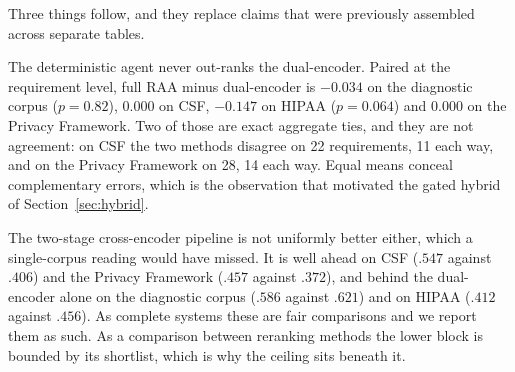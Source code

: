 \documentclass[a4paper,fleqn]{cas-sc}
\begin{document}
\begin{table}[htbp]
\caption{Top-1 accuracy for every method on all four corpora under the primary protocol: one scoring pass per requirement over the full control corpus, LSI fitted on controls only. The lower block reranks the dual-encoder's top 20 rather than the corpus, so it is bounded by that shortlist; its ceiling is given beneath it.}
\label{tab:unified}
\centering
\setlength{\tabcolsep}{3pt}
\small
{}
\end{table}

Three things follow, and they replace claims that were previously assembled across separate tables.

The deterministic agent never out-ranks the dual-encoder. Paired at the requirement level, full RAA minus dual-encoder is $-0.034$ on the diagnostic corpus ($p = 0.82$), $0.000$ on CSF, $-0.147$ on HIPAA ($p = 0.064$) and $0.000$ on the Privacy Framework. Two of those are exact aggregate ties, and they are not agreement: on CSF the two methods disagree on 22 requirements, 11 each way, and on the Privacy Framework on 28, 14 each way. Equal means conceal complementary errors, which is the observation that motivated the gated hybrid of Section~\ref{sec:hybrid}.

The two-stage cross-encoder pipeline is not uniformly better either, which a single-corpus reading would have missed. It is well ahead on CSF ($.547$ against $.406$) and the Privacy Framework ($.457$ against $.372$), and behind the dual-encoder alone on the diagnostic corpus ($.586$ against $.621$) and on HIPAA ($.412$ against $.456$). As complete systems these are fair comparisons and we report them as such. As a comparison between reranking methods the lower block is bounded by its shortlist, which is why the ceiling sits beneath it.
\end{document}
